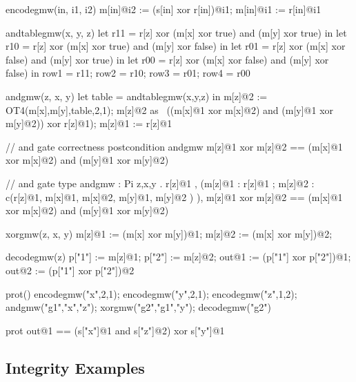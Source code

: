 \begin{verbatimtab}
    encodegmw(in, i1, i2) {
      m[in]@i2 := (s[in] xor r[in])@i1;
      m[in]@i1 := r[in]@i1
    }
    
    andtablegmw(x, y, z) {
      let r11 = r[z] xor (m[x] xor true) and (m[y] xor true) in
      let r10 = r[z] xor (m[x] xor true) and (m[y] xor false) in
      let r01 = r[z] xor (m[x] xor false) and (m[y] xor true) in
      let r00 = r[z] xor (m[x] xor false) and (m[y] xor false) in
      { row1 = r11; row2 = r10; row3 = r01; row4 = r00 }
    }
    
    andgmw(z, x, y) {
      let table = andtablegmw(x,y,z) in
      m[z]@2 := OT4(m[x],m[y],table,2,1);
      m[z]@2 as ~((m[x]@1 xor m[x]@2) and (m[y]@1 xor m[y]@2)) xor r[z]@1);
      m[z]@1 := r[z]@1
    }

    // and gate correctness postcondition
    {} andgmw { m[z]@1 xor m[z]@2 == (m[x]@1 xor m[x]@2) and (m[y]@1 xor m[y]@2) }

    // and gate type
    andgmw :
     Pi z,x,y .
     {}
     { { r[z]@1 },
       (m[z]@1 : { r[z]@1 }; m[z]@2 : {c(r[z]@1, { m[x]@1, m[x]@2, m[y]@1, m[y]@2 })} ),
       m[z]@1 xor m[z]@2 == (m[x]@1 xor m[x]@2) and (m[y]@1 xor m[y]@2)}
    
    xorgmw(z, x, y) {
      m[z]@1 := (m[x] xor m[y])@1; m[z]@2 := (m[x] xor m[y])@2;
    }
    
    decodegmw(z) {
      p["1"] := m[z]@1; p["2"] := m[z]@2;
      out@1 := (p["1"] xor p["2"])@1;
      out@2 := (p["1"] xor p["2"])@2
    }

    prot() {
      encodegmw("x",2,1);
      encodegmw("y",2,1);
      encodegmw("z",1,2);
      andgmw("g1","x","z");
      xorgmw("g2","g1","y");
      decodegmw("g2")
    }

    {} prot { out@1 == (s["x"]@1 and s["z"]@2) xor s["y"]@1 }
\end{verbatimtab}

\subsection{Integrity Examples}

